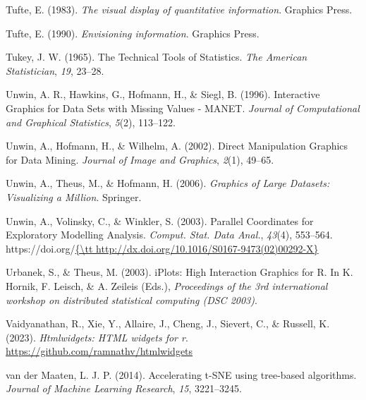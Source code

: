 \documentclass[
  letterpaper,
]{krantz}
\newlength{\cslhangindent}
\newlength{\cslentryspacingunit} %
\newenvironment{CSLReferences}[2] %
 {%
  \setlength{\parindent}{0pt}
  \ifodd #1
  \let\oldpar\par
  \def\par{\hangindent=\cslhangindent\oldpar}
  \fi
  \setlength{\parskip}{#2\cslentryspacingunit}
 }%
 {}
\begin{document}
\begin{CSLReferences}{1}{0}
\leavevmode{}%
Tufte, E. (1983). \emph{The visual display of quantitative information}.
Graphics Press.

\leavevmode{}%
Tufte, E. (1990). \emph{Envisioning information}. Graphics Press.

\leavevmode{}%
Tukey, J. W. (1965). The {T}echnical {T}ools of {S}tatistics. \emph{The
American Statistician}, \emph{19}, 23--28.

\leavevmode{}%
Unwin, A. R., Hawkins, G., Hofmann, H., \& Siegl, B. (1996).
{I}nteractive {G}raphics for {D}ata {S}ets with {M}issing {V}alues -
{MANET}. \emph{Journal of Computational and Graphical Statistics},
\emph{5}(2), 113--122.

\leavevmode{}%
Unwin, A., Hofmann, H., \& Wilhelm, A. (2002). Direct {M}anipulation
{G}raphics for {D}ata {M}ining. \emph{Journal of Image and Graphics},
\emph{2}(1), 49--65.

\leavevmode{}%
Unwin, A., Theus, M., \& Hofmann, H. (2006). \emph{Graphics of {L}arge
{D}atasets: {V}isualizing a {M}illion}. Springer.

\leavevmode{}%
Unwin, A., Volinsky, C., \& Winkler, S. (2003). Parallel {C}oordinates
for {E}xploratory {M}odelling {A}nalysis. \emph{Comput. Stat. Data
Anal.}, \emph{43}(4), 553--564.
https://doi.org/\href{\%7B/tt\%20http://dx.doi.org/10.1016/S0167-9473(02)00292-X\%7D}{\{\textbackslash tt
http://dx.doi.org/10.1016/S0167-9473(02)00292-X\}}

\leavevmode{}%
Urbanek, S., \& Theus, M. (2003). {iPlots}: {H}igh {I}nteraction
{G}raphics for {R}. In K. Hornik, F. Leisch, \& A. Zeileis (Eds.),
\emph{Proceedings of the 3rd international workshop on distributed
statistical computing (DSC 2003)}.

\leavevmode{}%
Vaidyanathan, R., Xie, Y., Allaire, J., Cheng, J., Sievert, C., \&
Russell, K. (2023). \emph{Htmlwidgets: HTML widgets for r}.
\url{https://github.com/ramnathv/htmlwidgets}

\leavevmode{}%
van der Maaten, L. J. P. (2014). Accelerating t-SNE using tree-based
algorithms. \emph{Journal of Machine Learning Research}, \emph{15},
3221--3245.


\end{CSLReferences}
\end{document}
